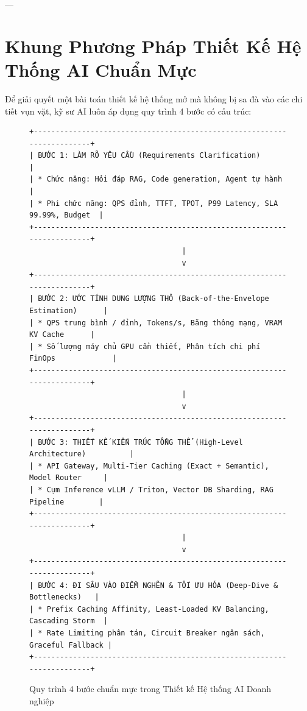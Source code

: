 ---

\section{Khung Phương Pháp Thiết Kế Hệ Thống AI Chuẩn Mực}
\label{sec:ch13-framework}

Để giải quyết một bài toán thiết kế hệ thống mở mà không bị sa đà vào các chi tiết vụn vặt, kỹ sư AI luôn áp dụng quy trình 4 bước có cấu trúc:

\begin{figure}[htbp]
\centering
\small
\begin{verbatim}
+------------------------------------------------------------------------+
| BƯỚC 1: LÀM RÕ YÊU CẦU (Requirements Clarification)                   |
| * Chức năng: Hỏi đáp RAG, Code generation, Agent tự hành              |
| * Phi chức năng: QPS đỉnh, TTFT, TPOT, P99 Latency, SLA 99.99%, Budget  |
+------------------------------------------------------------------------+
                                   |
                                   v
+------------------------------------------------------------------------+
| BƯỚC 2: ƯỚC TÍNH DUNG LƯỢNG THÔ (Back-of-the-Envelope Estimation)      |
| * QPS trung bình / đỉnh, Tokens/s, Băng thông mạng, VRAM KV Cache      |
| * Số lượng máy chủ GPU cần thiết, Phân tích chi phí FinOps             |
+------------------------------------------------------------------------+
                                   |
                                   v
+------------------------------------------------------------------------+
| BƯỚC 3: THIẾT KẾ KIẾN TRÚC TỔNG THỂ (High-Level Architecture)          |
| * API Gateway, Multi-Tier Caching (Exact + Semantic), Model Router     |
| * Cụm Inference vLLM / Triton, Vector DB Sharding, RAG Pipeline        |
+------------------------------------------------------------------------+
                                   |
                                   v
+------------------------------------------------------------------------+
| BƯỚC 4: ĐI SÂU VÀO ĐIỂM NGHẼN & TỐI ƯU HÓA (Deep-Dive & Bottlenecks)   |
| * Prefix Caching Affinity, Least-Loaded KV Balancing, Cascading Storm  |
| * Rate Limiting phân tán, Circuit Breaker ngân sách, Graceful Fallback |
+------------------------------------------------------------------------+
\end{verbatim}
\caption{Quy trình 4 bước chuẩn mực trong Thiết kế Hệ thống AI Doanh nghiệp}
\label{fig:ai-sys-design-framework}
\end{figure}


